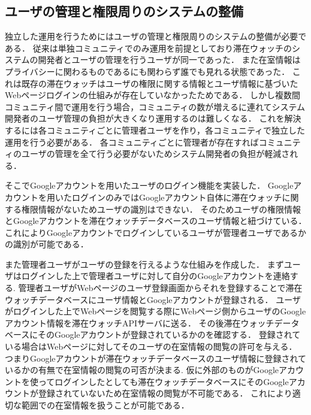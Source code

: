 
\subsection{ユーザの管理と権限周りのシステムの整備}
独立した運用を行うためにはユーザの管理と権限周りのシステムの整備が必要である．
従来は単独コミュニティでのみ運用を前提としており滞在ウォッチのシステムの開発者とユーザの管理を行うユーザが同一であった．
また在室情報はプライバシーに関わるものであるにも関わらず誰でも見れる状態であった．
これは既存の滞在ウォッチはユーザの権限に関する情報とユーザ情報に基づいたWebページログインの仕組みが存在していなかったためである．
しかし複数間コミュニティ間で運用を行う場合，コミュニティの数が増えるに連れてシステム開発者のユーザ管理の負担が大きくなり運用するのは難しくなる．
これを解決するには各コミュニティごとに管理者ユーザを作り，各コミュニティで独立した運用を行う必要がある．
各コミュニティごとに管理者が存在すればコミュニティのユーザの管理を全て行う必要がないためシステム開発者の負担が軽減される．

そこでGoogleアカウントを用いたユーザのログイン機能を実装した．
Googleアカウントを用いたログインのみではGoogleアカウント自体に滞在ウォッチに関する権限情報がないためユーザの識別はできない．
そのためユーザの権限情報とGoogleアカウントを滞在ウォッチデータベースのユーザ情報と紐づけている．
これによりGoogleアカウントでログインしているユーザが管理者ユーザであるかの識別が可能である．



また管理者ユーザがユーザの登録を行えるような仕組みを作成した．
まずユーザはログインした上で管理者ユーザに対して自分のGoogleアカウントを連絡する.
管理者ユーザがWebページのユーザ登録画面からそれを登録することで滞在ウォッチデータベースにユーザ情報とGoogleアカウントが登録される．
ユーザがログインした上でWebページを閲覧する際にWebページ側からユーザのGoogleアカウント情報を滞在ウォッチAPIサーバに送る．
その後滞在ウォッチデータベースにそのGoogleアカウントが登録されているかのを確認する．
登録されている場合はWebページに対してそのユーザの在室情報の閲覧の許可を与える．
つまりGoogleアカウントが滞在ウォッチデータベースのユーザ情報に登録されているかの有無で在室情報の閲覧の可否が決まる.
仮に外部のものがGoogleアカウントを使ってログインしたとしても滞在ウォッチデータベースにそのGoogleアカウントが登録されていないため在室情報の閲覧が不可能である．
これにより適切な範囲での在室情報を扱うことが可能である．